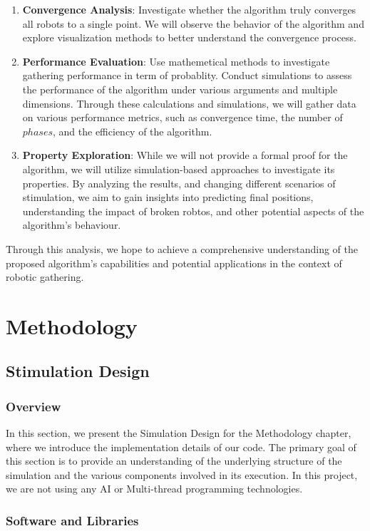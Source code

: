 \documentclass[]{report}
\begin{document}
\begin{enumerate}
\item \textbf{Convergence Analysis}: Investigate whether the algorithm truly converges all robots to a single point. We will observe the behavior of the algorithm and explore visualization methods to better understand the convergence process.
\item \textbf{Performance Evaluation}: Use mathemetical methods to investigate gathering performance in term of probablity. Conduct simulations to assess the performance of the algorithm under various arguments and multiple dimensions. Through these calculations and simulations, we will gather data on various performance metrics, such as convergence time, the number of \(phases\), and the efficiency of the algorithm.
\item \textbf{Property Exploration}: While we will not provide a formal proof for the algorithm, we will utilize simulation-based approaches to investigate its properties. By analyzing the results, and changing different scenarios of stimulation, we aim to gain insights into predicting final positions, understanding the impact of broken robtos, and other potential aspects of the algorithm's behaviour.
\end{enumerate}

Through this analysis, we hope to achieve a comprehensive understanding of the proposed algorithm's capabilities and potential applications in the context of robotic gathering.


\chapter{Methodology}
\section{Stimulation Design}
\subsection{Overview}

In this section, we present the Simulation Design for the Methodology chapter, where we introduce the implementation details of our code. The primary goal of this section is to provide an understanding of the underlying structure of the simulation and the various components involved in its execution. In this project, we are not using any AI or Multi-thread programming technologies. 

\subsection{Software and Libraries}
\end{document}
